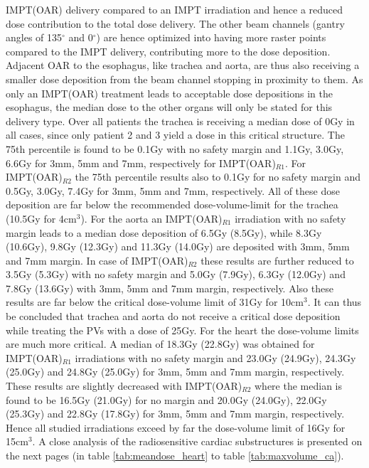 IMPT(OAR) delivery compared to an IMPT irradiation and hence a reduced dose contribution to the total dose delivery. The other beam 
channels (gantry angles of 135$^{\circ}$ and 0$^{\circ}$) are hence optimized into having more raster points compared to the IMPT delivery, 
contributing more to the dose deposition. Adjacent OAR to the esophagus, like trachea and aorta, are thus also receiving a smaller dose 
deposition from the beam channel stopping in proximity to them. As only an IMPT(OAR) treatment leads to acceptable dose depositions in the esophagus, 
the median dose to the other organs will only be stated for this delivery type.\newline
\newline
Over all patients the trachea is receiving a median dose of 
0Gy in all cases, since only patient 2 and 3 yield a dose in this critical structure. The 75th percentile is found to be 0.1Gy with no 
safety margin and 1.1Gy, 3.0Gy, 6.6Gy for 3mm, 5mm and 7mm, respectively for IMPT(OAR)$_{R1}$. For IMPT(OAR)$_{R2}$ the 75th percentile 
results also to 0.1Gy for no safety margin and 0.5Gy, 3.0Gy, 7.4Gy for 3mm, 5mm and 7mm, respectively. 
All of these dose deposition are far below the recommended dose-volume-limit for the trachea (10.5Gy for 4cm$^{3}$).\newline
\newline
For the aorta an IMPT(OAR)$_{R1}$ irradiation with no safety margin leads to a median dose deposition of 6.5Gy (8.5Gy), while 8.3Gy 
(10.6Gy), 9.8Gy (12.3Gy) and 11.3Gy (14.0Gy) are deposited with 3mm, 5mm and 7mm margin. In case of IMPT(OAR)$_{R2}$ these results are 
further reduced to 3.5Gy (5.3Gy) with no safety margin and 5.0Gy (7.9Gy), 6.3Gy (12.0Gy) and 7.8Gy (13.6Gy) with 3mm, 5mm and 7mm margin, respectively. 
Also these results are far below the critical dose-volume limit of 31Gy for 10cm$^{3}$. It can thus be concluded that trachea and aorta do 
not receive a critical dose deposition while treating the PVs with a dose of 25Gy.\newline 
\newline
For the heart the dose-volume limits are much more critical. A median of 18.3Gy (22.8Gy) was obtained for IMPT(OAR)$_{R1}$ irradiations with 
no safety margin and 23.0Gy (24.9Gy), 24.3Gy (25.0Gy) and 24.8Gy (25.0Gy) for 3mm, 5mm and 7mm margin, respectively. These results are 
slightly decreased with IMPT(OAR)$_{R2}$ where the median is found to be 16.5Gy (21.0Gy) for no margin and 20.0Gy (24.0Gy), 22.0Gy (25.3Gy) 
and 22.8Gy (17.8Gy) for 3mm, 5mm and 7mm margin, respectively. 
Hence all studied irradiations exceed by far the dose-volume limit of 16Gy for 15cm$^{3}$. 
A close analysis of the radiosensitive cardiac substructures is presented on the next pages (in table \ref{tab:meandose_heart} to table 
\ref{tab:maxvolume_ca}). 

